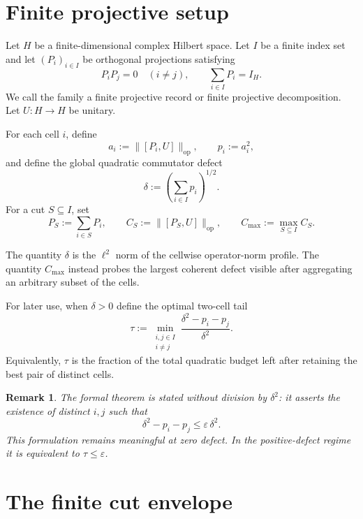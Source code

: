 \documentclass[11pt]{article}
\newtheorem{remark}[theorem]{Remark}
\newcommand{\op}{\mathrm{op}}
\newcommand{\cmax}{C_{\max}}
\newcommand{\dd}{\delta}
\newcommand{\tauq}{\tau}
\begin{document}
\section{Finite projective setup}

Let $H$ be a finite-dimensional complex Hilbert space.  Let
$I$ be a finite index set and let $(P_i)_{i\in I}$ be orthogonal projections
satisfying
\begin{equation}\label{eq:decomp}
  P_iP_j=0\quad(i\neq j),
  \qquad
  \sum_{i\in I}P_i=I_H.
\end{equation}
We call the family a finite projective record or finite projective
decomposition.  Let $U:H\to H$ be unitary.

For each cell $i$, define
\begin{equation}\label{eq:ai}
  a_i:=\|[P_i,U]\|_{\op},
  \qquad
  p_i:=a_i^2,
\end{equation}
and define the global quadratic commutator defect
\begin{equation}\label{eq:delta}
  \dd:=\left(\sum_{i\in I}p_i\right)^{1/2}.
\end{equation}
For a cut $S\subseteq I$, set
\begin{equation}\label{eq:cut}
  P_S:=\sum_{i\in S}P_i,
  \qquad
  C_S:=\|[P_S,U]\|_{\op},
  \qquad
  \cmax:=\max_{S\subseteq I}C_S.
\end{equation}

The quantity $\dd$ is the $\ell^2$ norm of the cellwise operator-norm profile.
The quantity $\cmax$ instead probes the largest coherent defect visible after
aggregating an arbitrary subset of the cells.

For later use, when $\dd>0$ define the optimal two-cell tail
\begin{equation}\label{eq:tau}
  \tauq:=
  \min_{\substack{i,j\in I\\i\neq j}}
  \frac{\dd^2-p_i-p_j}{\dd^2}.
\end{equation}
Equivalently, $\tauq$ is the fraction of the total quadratic budget left after
retaining the best pair of distinct cells.

\begin{remark}
The formal theorem is stated without division by $\dd^2$: it asserts the
existence of distinct $i,j$ such that
\[
  \dd^2-p_i-p_j\le \varepsilon\,\dd^2.
\]
This formulation remains meaningful at zero defect.  In the positive-defect
regime it is equivalent to $\tauq\le\varepsilon$.
\end{remark}

\section{The finite cut envelope}
\end{document}
